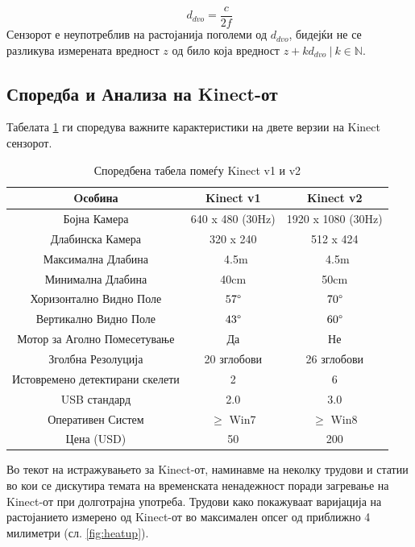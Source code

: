 \documentclass[11pt]{article}
\begin{document}
		    \begin{equation}
          d_{dvo} = \frac{c}{2f}
        \end{equation}
		    Сензорот е неупотреблив на растојанија поголеми од $d_{dvo}$, бидејќи не се разликува измерената вредност $z$ од било која вредност $z + k d_{dvo}\ | \ k \in \mathbb{N}$.

  \subsection{Споредба и Анализа на Kinect-от}
    Табелата \ref{tab:comparison} ги споредува важните карактеристики на двете верзии на Kinect сензорот.
    \begin{table}[H]
      \centering
      \label{tab:comparison}
      \caption{Споредбена табела помеѓу Kinect v1 и v2}
      \begin{tabular}{||c|c|c||}
        \hline
        \textbf{Oсобина} & \textbf{Kinect v1} & \textbf{Kinect v2} \\
        \hline
        Бојна Камера & 640 x 480 (30Hz) & 1920 x 1080 (30Hz) \\
        \hline
        Длабинска Камера & 320 x 240 & 512 x 424 \\
        \hline
        Максимална Длабина & ~4.5m & ~4.5m \\
        \hline
        Минимална Длабина & 40cm & 50cm \\
        \hline
        Хоризонтално Видно Поле & $57\degree$ & $70\degree$ \\
        \hline
        Вертикално Видно Поле & $43\degree$ & $60\degree$ \\
        \hline
        Мотор за Аголно Помесетување & Да & Не \\
        \hline
        Зголбна Резолуција & 20 зглобови & 26 зглобови \\
        \hline
        Истовремено детектирани скелети &  2 & 6 \\
        \hline
        USB стандард & 2.0 & 3.0 \\
        \hline
        Оперативен Систем & $\geq$ Win7 & $\geq$ Win8 \\
        \hline
        Цена (USD) & 50 & 200 \\
        \hline
      \end{tabular}
      \end{table}

    Во текот на истражувањето за Kinect-от, наминавме на неколку трудови и статии во кои се дискутира темата на временската ненадежност поради загревање на Kinect-от при долготрајна употреба. Трудови како \cite{heatup} покажуваат варијација на растојанието измерено од Kinect-от во максимален опсег од приближно 4 милиметри (сл. \ref{fig:heatup}).
\end{document}
